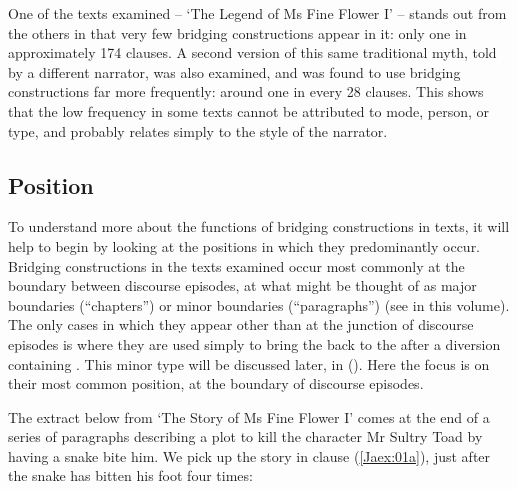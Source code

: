 \documentclass[output=paper]{LSP/langsci}
\begin{document}
One of the texts examined -- `The Legend of Ms Fine Flower I' -- stands out from the others in that very few bridging constructions appear in it: only one in approximately 174 clauses. A second version of this same traditional myth, told by a different narrator, was also examined, and was found to use bridging constructions far more frequently: around one in every 28 clauses. This shows that the low frequency in some texts cannot be attributed to  mode, person, or type, and probably relates simply to the style of the narrator.

%
\subsection{Position}
\label{JaPosition}
To understand more about the functions of bridging constructions in  texts, it will help to begin by looking at the positions in which they predominantly occur. Bridging constructions in the texts examined occur most commonly at the boundary between discourse episodes, at what might be thought of as major boundaries (``chapters'') or minor boundaries (``paragraphs'') (see \citeauthor{guerin18} in this volume). The only cases in which they appear other than at the junction of discourse episodes is where they are used simply to bring the  back to the  after a diversion containing . This minor type will be discussed later, in (). Here the focus is on their most common position, at the boundary of discourse episodes.
 
The extract below from `The Story of Ms Fine Flower I' comes at the end of a series of paragraphs describing a plot to kill the character Mr Sultry Toad by having a snake bite him. We pick up the story in clause (\ref{Jaex:01a}), just after the snake has bitten his foot four times:
 
\end{document}
